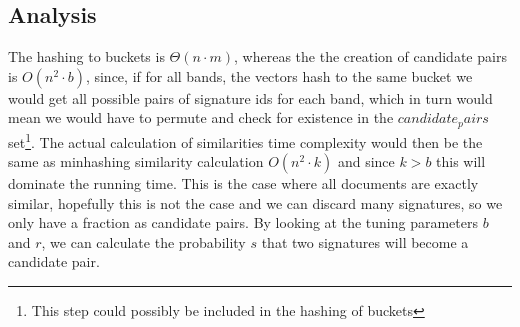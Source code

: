 \documentclass[a4paper,11pt]{article}
\makeatletter
\def\BState{\State\hskip-\ALG@thistlm}
\makeatother
\begin{document}
\begin{center}   
    \label{alg:lsh}
\end{center}

\subsection{Analysis}
The hashing to buckets is $\Theta(n\cdot m)$, whereas the the creation of candidate pairs is $O(n^2 \cdot b)$, since, if for all bands, the vectors hash to the same bucket we would get all possible pairs of signature ids for each band, which in turn would mean we would have to permute and check for existence in the $candidate_pairs$ set\footnote{This step could possibly be included in the hashing of buckets}. The actual calculation of similarities time complexity would then be the same as minhashing similarity calculation $O(n^2 \cdot k)$ and since $k>b$ this will dominate the running time. This is the case where all documents are exactly similar, hopefully this is not the case and we can discard many signatures, so we only have a fraction as candidate pairs. By looking at the tuning parameters $b$ and $r$, we can calculate the probability $s$ that two signatures will become a candidate pair. \\
\end{document}
